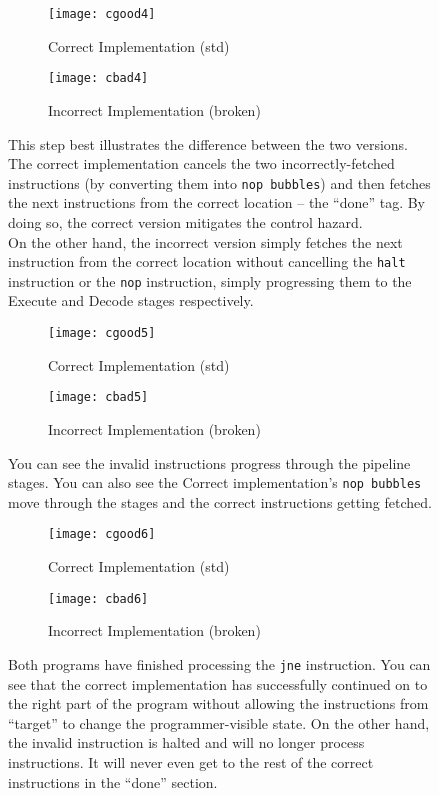 \documentclass[12pt, letterpaper]{article}
\begin{document}
\begin{figure}[h]
  \begin{subfigure}{0.5\textwidth}
    \texttt{[image: cgood4]}
    \caption{Correct Implementation (std)}
    \label{fig:cgood4}
    \end{subfigure}
  \begin{subfigure}{0.5\textwidth}
    \texttt{[image: cbad4]}
    \caption{Incorrect Implementation (broken)}
    \label{fig:cbad4}
  \end{subfigure}
  \caption
{This step best illustrates the difference between the two versions. The
correct implementation cancels the two incorrectly-fetched instructions (by
converting them into \texttt{nop bubbles}) and then fetches the next instructions
from the correct location – the ``done'' tag. By doing so, the correct version
mitigates the control hazard. \\
On the other hand, the incorrect version simply fetches the next instruction
from the correct location without cancelling the \texttt{halt} instruction or the
\texttt{nop} instruction, simply progressing them to the Execute and Decode stages
respectively.}
  \label{fig:c4}
\end{figure}
\begin{figure}[h]
  \begin{subfigure}{0.5\textwidth}
    \texttt{[image: cgood5]}
    \caption{Correct Implementation (std)}
    \label{fig:cgood5}
    \end{subfigure}
  \begin{subfigure}{0.5\textwidth}
    \texttt{[image: cbad5]}
    \caption{Incorrect Implementation (broken)}
    \label{fig:cbad5}
  \end{subfigure}
  \caption{You can see the invalid instructions progress through the pipeline
stages. You can also see the Correct implementation's \texttt{nop bubbles} move
through the stages and the correct instructions getting fetched.}
  \label{fig:c5}
\end{figure}
\begin{figure}[h]
  \begin{subfigure}{0.5\textwidth}
    \texttt{[image: cgood6]}
    \caption{Correct Implementation (std)}
    \label{fig:cgood6}
    \end{subfigure}
  \begin{subfigure}{0.5\textwidth}
    \texttt{[image: cbad6]}
    \caption{Incorrect Implementation (broken)}
    \label{fig:cbad6}
  \end{subfigure}
  \caption{Both programs have finished processing the \texttt{jne} instruction.
You can see that the correct implementation has successfully continued on to the
right part of the program without allowing the instructions from ``target'' to
change the programmer-visible state. On the other hand, the invalid instruction
is halted and will no longer process instructions. It will never even get to the
rest of the correct instructions in the ``done'' section.}
  \label{fig:c6}
\end{figure}
\end{document}
